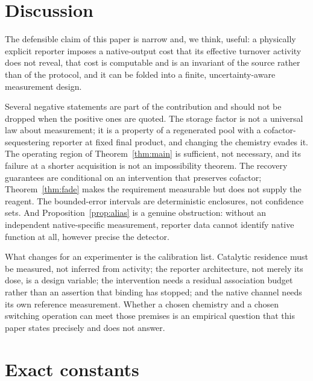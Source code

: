 \documentclass[11pt]{article}
\theoremstyle{definition}
\theoremstyle{remark}
\begin{document}
\section{Discussion}

The defensible claim of this paper is narrow and, we think, useful: a physically
explicit reporter imposes a native-output cost that its effective turnover
activity does not reveal, that cost is computable and is an invariant of the
source rather than of the protocol, and it can be folded into a finite,
uncertainty-aware measurement design.

Several negative statements are part of the contribution and should not be
dropped when the positive ones are quoted. The storage factor is not a universal
law about measurement; it is a property of a regenerated pool with a
cofactor-sequestering reporter at fixed final product, and changing the
chemistry evades it. The operating region of Theorem~\ref{thm:main} is
sufficient, not necessary, and its failure at a shorter acquisition is not an
impossibility theorem. The recovery guarantees are conditional on an
intervention that preserves cofactor; Theorem~\ref{thm:fade} makes the
requirement measurable but does not supply the reagent. The bounded-error
intervals are deterministic enclosures, not confidence sets. And
Proposition~\ref{prop:alias} is a genuine obstruction: without an independent
native-specific measurement, reporter data cannot identify native function at
all, however precise the detector.

What changes for an experimenter is the calibration list. Catalytic residence
must be measured, not inferred from activity; the reporter architecture, not
merely its dose, is a design variable; the intervention needs a residual
association budget rather than an assertion that binding has stopped; and the
native channel needs its own reference measurement. Whether a chosen chemistry
and a chosen switching operation can meet those premises is an empirical
question that this paper states precisely and does not answer.

\appendix
\section{Exact constants}
\label{app:constants}
\end{document}
